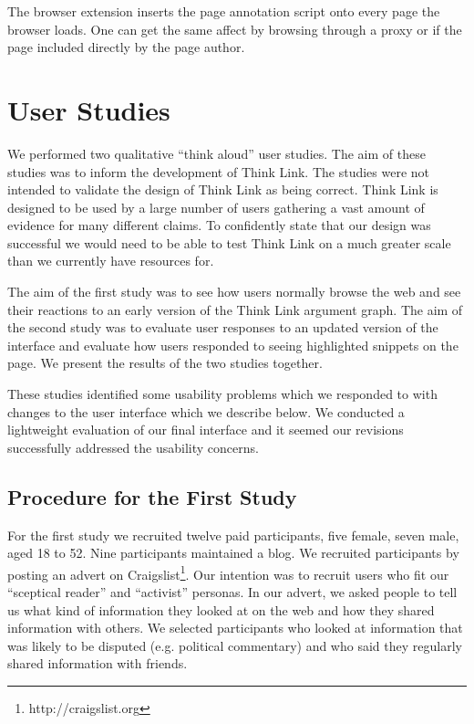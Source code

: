 \documentclass{chi2009}
\newcommand{\todo}[1]{}
\begin{document}
The browser extension inserts the page annotation script onto every page the browser loads. One can get the same affect by browsing through a proxy or if the page included directly by the page author.




\section{User Studies}

We performed two qualitative ``think aloud'' user studies. The aim of these studies was to inform the development of Think Link. The studies were not intended to validate the design of Think Link as being correct. Think Link is designed to be used by a large number of users gathering a vast amount of evidence for many different claims. To confidently state that our design was successful we would need to be able to test Think Link on a much greater scale than we currently have resources for.

The aim of the first study was to see how users normally browse the web and see their reactions to an early version of the Think Link argument graph. The aim of the second study was to evaluate user responses to an updated version of the interface and evaluate how users responded to seeing highlighted snippets on the page. We present the results of the two studies together.

These studies identified some usability problems which we responded to with changes to the user interface which we describe below. We conducted a lightweight evaluation of our final interface and it seemed our revisions successfully addressed the usability concerns.

\todo{Test with at least 4 people}
\todo{Say something about final informal evaluation}


\subsection{Procedure for the First Study}

For the first study we recruited twelve paid participants, five female, seven male, aged 18 to 52. Nine participants maintained a blog. We recruited participants by posting an advert on Craigslist\footnote{http://craigslist.org}.
Our intention was to recruit users who fit our ``sceptical reader'' and ``activist'' personas. In our advert, we asked people to tell us what kind of information they looked at on the web and how they shared information with others. We selected participants who looked at information that was likely to be disputed (e.g. political commentary) and who said they regularly shared information with friends. 
\end{document}
